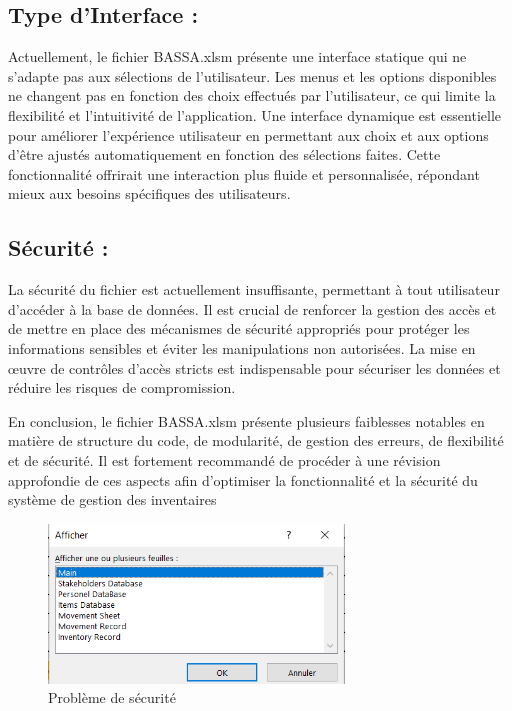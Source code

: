 \documentclass[a4paper, oneside, 12pt, final]{extreport}
\begin{document}
\subsection{Type d'Interface :}
Actuellement, le fichier BASSA.xlsm présente une interface statique qui ne s'adapte pas aux sélections de l'utilisateur. Les menus et les options disponibles ne changent pas en fonction des choix effectués par l'utilisateur, ce qui limite la flexibilité et l'intuitivité de l'application. Une interface dynamique est essentielle pour améliorer l'expérience utilisateur en permettant aux choix et aux options d'être ajustés automatiquement en fonction des sélections faites. Cette fonctionnalité offrirait une interaction plus fluide et personnalisée, répondant mieux aux besoins spécifiques des utilisateurs.

\subsection{Sécurité :}
La sécurité du fichier est actuellement insuffisante, permettant à tout utilisateur d'accéder à la base de données. Il est crucial de renforcer la gestion des accès et de mettre en place des mécanismes de sécurité appropriés pour protéger les informations sensibles et éviter les manipulations non autorisées. La mise en œuvre de contrôles d'accès stricts est indispensable pour sécuriser les données et réduire les risques de compromission.

En conclusion, le fichier BASSA.xlsm présente plusieurs faiblesses notables en matière de structure du code, de modularité, de gestion des erreurs, de flexibilité et de sécurité. Il est fortement recommandé de procéder à une révision approfondie de ces aspects afin d'optimiser la fonctionnalité et la sécurité du système de gestion des inventaires
\begin{figure}[h]
    \centering
    \includegraphics[width=0.7\textwidth]{Capture2.png} %
    \caption{Problème de sécurité}
    \label{fig:Problème de sécurité}
\end{figure}
\end{document}
